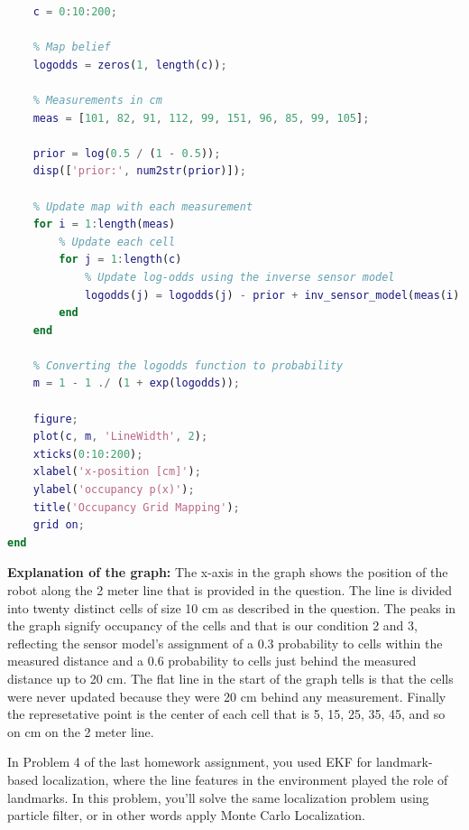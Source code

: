 \documentclass[answers]{exam}
\begin{document}
\begin{questions}
\begin{solution}
\begin{lstlisting}[language=Matlab, caption=Occupancy Grid Mapping, label={lst:code}]
    % We divide our path of 2 meter into grids of 10 cm
    c = 0:10:200;

    % Map belief
    logodds = zeros(1, length(c));

    % Measurements in cm
    meas = [101, 82, 91, 112, 99, 151, 96, 85, 99, 105];

    prior = log(0.5 / (1 - 0.5));
    disp(['prior:', num2str(prior)]);

    % Update map with each measurement
    for i = 1:length(meas)
        % Update each cell
        for j = 1:length(c)
            % Update log-odds using the inverse sensor model
            logodds(j) = logodds(j) - prior + inv_sensor_model(meas(i), c(j));
        end
    end

    % Converting the logodds function to probability 
    m = 1 - 1 ./ (1 + exp(logodds));

    figure;
    plot(c, m, 'LineWidth', 2);
    xticks(0:10:200);
    xlabel('x-position [cm]');
    ylabel('occupancy p(x)');
    title('Occupancy Grid Mapping');
    grid on;
end     
        \end{lstlisting}

        \textbf{Explanation of the graph:} The x-axis in the graph shows the position of the robot along the 2 meter line that is provided in the question. The line is divided into twenty distinct cells of size 10 cm as described in the question. The peaks in the graph signify occupancy of the cells and that is our condition 2 and 3, reflecting the sensor model's assignment of a 0.3 probability to cells within the measured distance and a 0.6 probability to cells just behind the measured distance up to 20 cm. The flat line in the start of the graph tells is that the cells were never updated because they were 20 cm behind any measurement. Finally the represetative point is the center of each cell that is 5, 15, 25, 35, 45, and so on cm on the 2 meter line. 

        
    \end{solution}

    \question[25]
    In Problem 4 of the last homework assignment, you used EKF for landmark-based localization, where the line features in the environment played the role of landmarks. In this problem, you'll solve the same localization problem using particle filter, or in other words apply Monte Carlo Localization.

    \begin{solution}
    \end{solution}


\end{questions}
\end{document}
